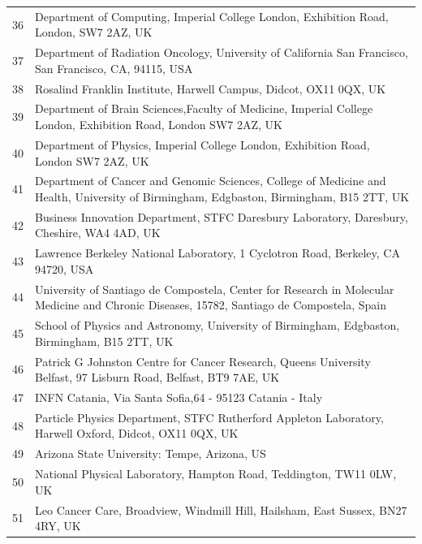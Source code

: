 {\begin{tabular}{ c p{15cm} }
     36 & Department of Computing, Imperial College London, Exhibition Road, London, SW7 2AZ, UK\\
     37 & Department of Radiation Oncology, University of California San Francisco, San Francisco, CA, 94115, USA\\
     38 & Rosalind Franklin Institute, Harwell Campus, Didcot, OX11 0QX, UK\\
     39 & Department of Brain Sciences,Faculty of Medicine, Imperial College London, Exhibition Road, London SW7 2AZ, UK\\
     40 & Department of Physics, Imperial College London, Exhibition Road, London SW7 2AZ, UK\\
     41 & Department of Cancer and Genomic Sciences, College of Medicine and Health, University of Birmingham, Edgbaston, Birmingham, B15 2TT, UK\\
     42 & Business Innovation Department, STFC Daresbury Laboratory, Daresbury, Cheshire, WA4 4AD, UK\\
     43 & Lawrence Berkeley National Laboratory, 1 Cyclotron Road, Berkeley, CA 94720, USA\\
     44 & University of Santiago de Compostela, Center for Research in Molecular Medicine and Chronic Diseases, 15782, Santiago de Compostela, Spain\\
     45 & School of Physics and Astronomy, University of Birmingham, Edgbaston, Birmingham, B15 2TT, UK\\
     46 & Patrick G Johnston Centre for Cancer Research, Queens University Belfast, 97 Lisburn Road, Belfast, BT9 7AE, UK\\
     47 & INFN Catania, Via Santa Sofia,64 - 95123 Catania - Italy\\
     48 & Particle Physics Department, STFC Rutherford Appleton Laboratory, Harwell Oxford, Didcot, OX11 0QX, UK\\
     49 & Arizona State University: Tempe, Arizona, US\\
     50 & National Physical Laboratory, Hampton Road, Teddington, TW11 0LW, UK\\
     51 & Leo Cancer Care, Broadview, Windmill Hill, Hailsham, East Sussex, BN27 4RY, UK\\
  \end{tabular}
}
